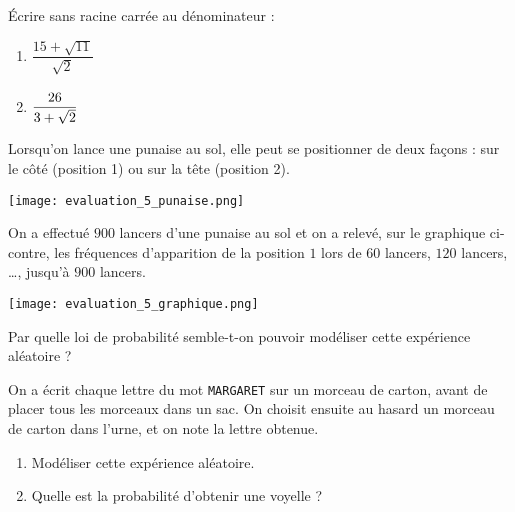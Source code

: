 \documentclass[a4paper,dvipsnames]{article}
\begin{document}
\bigskip

\exo[2 points]\vspace{-2mm} Écrire sans racine carrée au dénominateur :
\begin{multicols}{2}
  \begin{enumerate}
    \item $\dfrac{15+\sqrt{11}}{\sqrt{2}}$
    \item $\dfrac{26}{3+\sqrt{2}}\vphantom{\dfrac{\sqrt{2}}{\sqrt{11}}}$
  \end{enumerate}
\end{multicols}
  \dotfill{}

\bigskip

\exo[1 point]\vspace{-2mm} 
\vspace*{-5mm}
\begin{multicols}{2}
  Lorsqu'on lance une punaise au sol, elle peut se positionner de deux façons : sur le côté (position 1) ou sur la tête (position 2).

  \begin{center}
    \texttt{[image: evaluation\_5\_punaise.png]}
  \end{center}

  On a effectué $900$ lancers d'une punaise au sol et on a relevé, sur le graphique ci-contre, les fréquences d'apparition de la position $1$ lors de $60$ lancers, $120$ lancers, \dots, jusqu'à $900$ lancers.

  \begin{center}
    \texttt{[image: evaluation\_5\_graphique.png]}
  \end{center}
\end{multicols}
  Par quelle loi de probabilité semble-t-on pouvoir modéliser cette expérience aléatoire ?

\bigskip

\exo[2 points]\vspace{-2mm} On a écrit chaque lettre du mot \verb|MARGARET| sur un morceau de carton, avant de placer tous les morceaux dans un sac. On choisit ensuite au hasard un morceau de carton dans l'urne, et on note la lettre obtenue.
\begin{enumerate}
  \item Modéliser cette expérience aléatoire.
  \item Quelle est la probabilité d'obtenir une voyelle ?
\end{enumerate}

\bigskip
\end{document}
